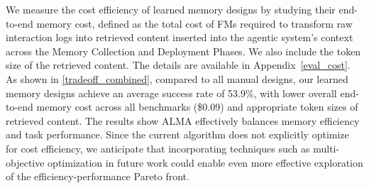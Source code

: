 \documentclass{article}
\theoremstyle{plain}
\theoremstyle{definition}
\theoremstyle{remark}
\newcommand{\ouralgo}{ALMA\xspace} %
\begin{document}
We measure the cost efficiency of learned memory designs by studying their end-to-end memory cost, defined as the total cost of FMs required to transform raw interaction logs into retrieved content inserted into the agentic system's context across the Memory Collection and Deployment Phases. We also include the token size of the retrieved content. The details are available in Appendix~\ref{eval_cost}.
As shown in \cref{tradeoff_combined}, compared to all manual designs, our learned memory designs achieve an average success rate of 53.9\%, with lower overall end-to-end memory cost across all benchmarks (\$0.09) and appropriate token sizes of retrieved content. The results show \ouralgo effectively balances memory efficiency and task performance. Since the current algorithm does not explicitly optimize for cost efficiency, we anticipate that incorporating techniques such as multi-objective optimization in future work could enable even more effective exploration of the efficiency-performance Pareto front.


\vspace{-0.6em}
\end{document}
